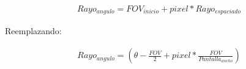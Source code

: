 \begin{equation}
\begin{aligned}
\label{foveq}
Rayo_{angulo} = FOV_{inicio} + pixel * Rayo_{espaciado} 
\end{aligned}
\end{equation}

Reemplazando:

\begin{equation}
\begin{aligned}
\label{foveq}
Rayo_{angulo} = \left(\theta - \frac{FOV}{2} + pixel * \frac{FOV}{Pantalla_{ancho}} \right)
\end{aligned}
\end{equation}

